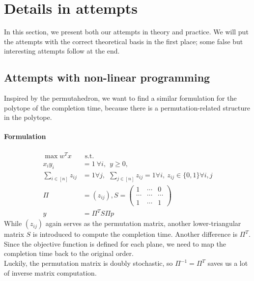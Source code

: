 \documentclass[12pt,letterpaper]{article}
\begin{document}
\section{Details in attempts}
In this section, we present both our attempts in theory and practice. 
We will put the attempts with the correct theoretical basis in the first place; some false but interesting attempts follow at the end. 

\subsection{Attempts with non-linear programming}
Inspired by the permutahedron, we want to find a similar formulation for the polytope of the completion time,
because there is a permutation-related structure in the polytope. 

\paragraph{Formulation}
\begin{align*}
    \max w^Tx& \text{ s.t. } \label{eq:C} \tag{C} \\
 x_i y_i &= 1 \ \forall i, \ \ y \geq 0, \\ 
    \sum_{i \in [n]} z_{ij} &= 1 \forall j,  \ \ 
    \sum_{j \in [n]} z_{ij} = 1 \forall i,  \ z_{ij} \in \{0, 1\} \forall i, j \\ 
    \Pi &= (z_{ij}), S = \begin{pmatrix}
        1 & \cdots & 0 \\ 
        \cdots & \cdots & \cdots \\ 
        1 & \cdots & 1
    \end{pmatrix} \\
 y &= \Pi^T S \Pi p 
\end{align*}
While $(z_{ij})$ again serves as the permutation matrix, another lower-triangular matrix $S$ is introduced to
compute the completion time. Another difference is $\Pi^T$. Since the objective function is defined  
for each plane, we need to map the completion time back to the original order.\\
Luckily, the permutation matrix is doubly stochastic, so $\Pi^{-1} = \Pi^T$ saves us a lot of inverse matrix computation. 
\end{document}
